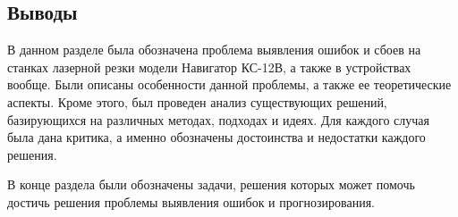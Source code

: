 \newpage

\subsection{Выводы}

В данном разделе была обозначена проблема выявления ошибок и сбоев на станках лазерной резки модели Навигатор КС-12В,
а также в устройствах вообще.
Были описаны особенности данной проблемы, а также ее теоретические аспекты. Кроме этого, был проведен анализ
существующих решений, базирующихся на различных методах, подходах и идеях.
Для каждого случая была дана критика, а именно обозначены достоинства и недостатки каждого решения.

В конце раздела были обозначены задачи, решения которых может помочь достичь решения проблемы выявления ошибок и прогнозирования.


\clearpage